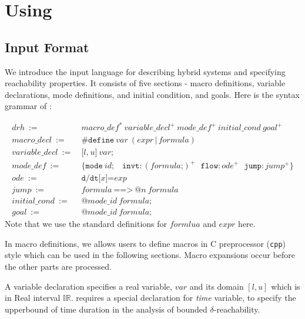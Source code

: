 \section{Using \dReach{}}\label{sec:using-dreach}
\subsection{Input Format}\label{sec:input-format}
We introduce the input language \drh{} for describing hybrid
systems and specifying reachability properties. It consists of five
sections - macro definitions, variable declarations, mode definitions,
and initial condition, and goals. Here is the syntax grammar of \drh{}:

\begin{align*}
  \mathit{drh} \ := \ & \mathit{macro\_def}^* \
  \mathit{variable\_decl}^+ \ \mathit{mode\_def}^+ \  \mathit{initial\_cond} \  \mathit{goal}^+\\
  \mathit{macro\_decl} \ := \ &  \texttt{\#define} \ \mathit{var} \ (\mathit{expr} \, | \, \mathit{formula})\\
  \mathit{variable\_decl} \ := \ &  \texttt{[} \mathit{l} \texttt{,} \ \mathit{u} \texttt{]} \ \mathit{var} \texttt{;}\\
  \mathit{mode\_def} \ := \ & \texttt{\{}
  \texttt{mode} \
  \mathit{id}\texttt{;} \quad
  \texttt{invt}:(\mathit{formula} \texttt{;})^+ \ \ \
  \texttt{flow}:\mathit{ode}^+ \ \ \ \texttt{jump}:\mathit{jump}^+ \texttt{\}}\\
  \mathit{ode} \ := \ & \texttt{d/dt[}\mathit{x}\texttt{]=}\mathit{exp}\\
  \mathit{jump} \ := \ & \mathit{formula} \ \texttt{==>} \ \texttt{@}\mathit{n} \ \mathit{formula}\\
  \mathit{initial\_cond} \ := \ & \texttt{@}\mathit{mode\_id} \ \mathit{formula}\texttt{;}\\
  \mathit{goal}              \ := \ & \texttt{@}\mathit{mode\_id} \ \mathit{formula}\texttt{;}
\end{align*}
Note that we use the standard definitions for $\mathit{formlua}$ and
$\mathit{expr}$ here.

In macro definitions, we allows users to define macros in C
preprocessor (\texttt{cpp}) style which can be used in the following
sections. Macro expansions occur before the other parts are processed.

A variable declaration specifies a real variable, $var$ and its domain
$[l, u]$ which is in Real interval $\mathbb{IR}$. \drh{} requires a
special declaration for \textit{time} variable, to specify the
upperbound of time duration in the analysis of bounded
$\delta$-reachability.

